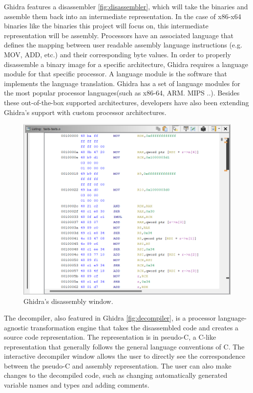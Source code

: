 Ghidra features a disassembler \ref{fig:disassembler}, which will take the binaries and assemble them back into an intermediate representation. In the case of x86-x64 binaries like the binaries this project will focus on, this intermediate representation will be assembly. Processors have an associated language that defines the mapping
between user readable assembly language instructions (e.g. MOV, ADD, etc.) and their corresponding byte values. In order to properly disassemble a binary image for a specific architecture, Ghidra requires a language module for that specific processor. A language module is the software that implements the language translation. Ghidra has a set of language modules for the most popular processor languages(such as x86-64, ARM. MIPS ..). Besides these out-of-the-box supported architectures, developers have also been extending Ghidra's support with custom processor architectures. 
\label{fig:disassembler}
\begin{figure}[!h]
  \centering
  \includegraphics[width=\linewidth]{img/disassembler.png}
  \caption{Ghidra's disassembly window.}
\end{figure}

The decompiler, also featured in Ghidra \ref{fig:decompiler}, is a processor language-agnostic transformation engine that takes the disassembled code and creates a source code representation. The representation is in pseudo-C, a C-like representation that generally follows the general language conventions of C. The interactive decompiler window allows the user to directly see the correspondence between the pseudo-C and assembly representation. The user can also make changes to the decompiled code, such as changing automatically generated variable names and types and adding comments. 

